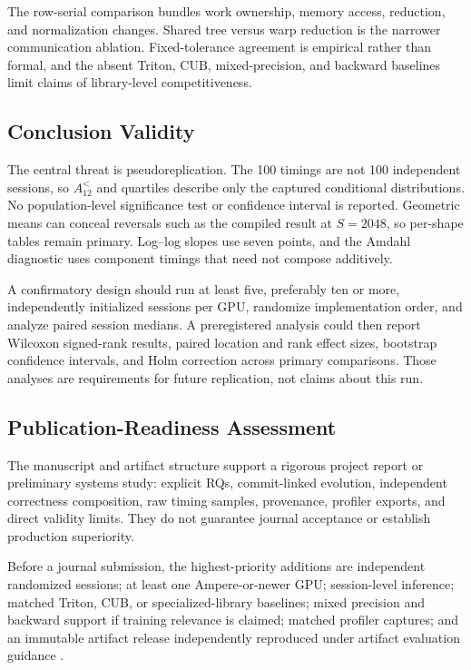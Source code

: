 \documentclass[twoside,twocolumn,10pt]{article}
\begin{document}
The row-serial comparison bundles work ownership, memory access, reduction,
and normalization changes. Shared tree versus warp reduction is the narrower
communication ablation. Fixed-tolerance agreement is empirical rather than
formal, and the absent Triton, CUB, mixed-precision, and backward baselines
limit claims of library-level competitiveness.

\subsection{Conclusion Validity}

The central threat is pseudoreplication. The 100 timings are not 100
independent sessions, so $A_{12}^{<}$ and quartiles describe only the captured
conditional distributions. No population-level significance test or
confidence interval is reported. Geometric means can conceal reversals such as
the compiled result at $S=2048$, so per-shape tables remain primary. Log--log
slopes use seven points, and the Amdahl diagnostic uses component timings that
need not compose additively.

A confirmatory design should run at least five, preferably ten or more,
independently initialized sessions per GPU, randomize implementation order,
and analyze paired session medians. A preregistered analysis could then report
Wilcoxon signed-rank results, paired location and rank effect sizes, bootstrap
confidence intervals, and Holm correction across primary comparisons. Those
analyses are requirements for future replication, not claims about this run.

\subsection{Publication-Readiness Assessment}

The manuscript and artifact structure support a rigorous project report or
preliminary systems study: explicit RQs, commit-linked evolution, independent
correctness composition, raw timing samples, provenance, profiler exports, and
direct validity limits. They do not guarantee journal acceptance or establish
production superiority.

Before a journal submission, the highest-priority additions are independent
randomized sessions; at least one Ampere-or-newer GPU; session-level inference;
matched Triton, CUB, or specialized-library baselines; mixed precision and
backward support if training relevance is claimed; matched profiler captures;
and an immutable artifact release independently reproduced under artifact
evaluation guidance \cite{acm_artifacts}.
\end{document}
